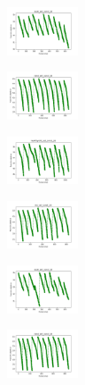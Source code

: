 \begin{figure}[H]
\begin{subfigure}
        \centering
        \includegraphics[width=0.234\textwidth]{img/bmb/ecoli_set_const_20_589741062_cost.png}
    \end{subfigure}
    \hfill
    \begin{subfigure}
        \centering
        \includegraphics[width=0.234\textwidth]{img/bmb/rand_set_const_20_589741062_cost.png}
    \end{subfigure}
    \hfill
    \begin{subfigure}
        \centering
        \includegraphics[width=0.234\textwidth]{img/bmb/newthyroid_set_const_20_589741062_cost.png}
    \end{subfigure}
    \hfill
    \begin{subfigure}
        \centering
        \includegraphics[width=0.234\textwidth]{img/bmb/iris_set_const_20_277451237_cost.png}
    \end{subfigure}
    \hfill
    \begin{subfigure}
        \centering
        \includegraphics[width=0.234\textwidth]{img/bmb/ecoli_set_const_20_277451237_cost.png}
    \end{subfigure}
    \hfill
    \begin{subfigure}
        \centering
        \includegraphics[width=0.234\textwidth]{img/bmb/rand_set_const_20_277451237_cost.png}

\end{subfigure}
\end{figure}
